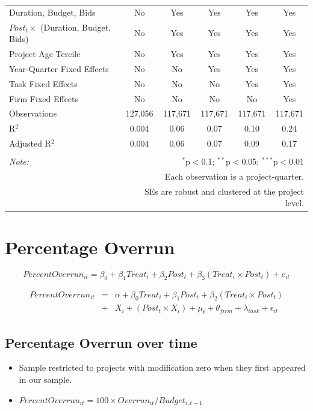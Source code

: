 \documentclass[
]{article}
\providecommand{\tightlist}{%
  \setlength{\itemsep}{0pt}\setlength{\parskip}{0pt}}
\begin{document}
\begin{table}[H]
\begin{tabular}{@{\extracolsep{-2pt}}lccccc}
Duration, Budget, Bids & No & Yes & Yes & Yes & Yes \\ 
$Post_t \times$  (Duration, Budget, Bids) & No & Yes & Yes & Yes & Yes \\ 
Project Age Tercile & No & Yes & Yes & Yes & Yes \\ 
Year-Quarter Fixed Effects & No & No & Yes & Yes & Yes \\ 
Task Fixed Effects & No & No & No & Yes & Yes \\ 
Firm Fixed Effects & No & No & No & No & Yes \\ 
Observations & 127,056 & 117,671 & 117,671 & 117,671 & 117,671 \\ 
R$^{2}$ & 0.004 & 0.06 & 0.07 & 0.10 & 0.24 \\ 
Adjusted R$^{2}$ & 0.004 & 0.06 & 0.07 & 0.09 & 0.17 \\ 
\hline 
\hline \\[-1.8ex] 
\textit{Note:}  & \multicolumn{5}{r}{$^{*}$p$<$0.1; $^{**}$p$<$0.05; $^{***}$p$<$0.01} \\ 
 & \multicolumn{5}{r}{Each observation is a project-quarter.} \\ 
 & \multicolumn{5}{r}{SEs are robust and clustered at the project level.} \\ 
\end{tabular} 
\end{table}

\hypertarget{percentage-overrun}{%
\section{Percentage Overrun}\label{percentage-overrun}}

\[ PercentOverrun_{it} = \beta_0 + \beta_1 Treat_i + \beta_2 Post_t + \beta_3 (Treat_i \times Post_t) + e_{it}\]

\[ \begin{aligned} PercentOverrun_{it} &=& \alpha+\beta_0 Treat_i + \beta_1 Post_t + \beta_2 (Treat_i \times Post_t)\\
&+&  X_i + (Post_t \times X_i) + \mu_t + \theta_{firm} + \lambda_{task}+ \epsilon_{it}
\end{aligned}\]

\hypertarget{percentage-overrun-over-time}{%
\subsection{Percentage Overrun over
time}\label{percentage-overrun-over-time}}

\begin{itemize}
\tightlist
\item
  Sample restricted to projects with modification zero when they first
  appeared in our sample.
\item
  \(PercentOverrun_{it}=100 \times Overrun_{it}/Budget_{i,t-1}\)
\end{itemize}
\end{document}

